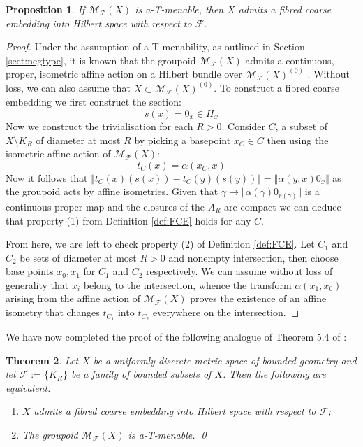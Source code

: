 \documentclass[preprint]{elsarticle}
\theoremstyle{plain}
\newtheorem{theorem}{Theorem}%
\newtheorem{proposition}[theorem]{Proposition}%
\theoremstyle{definition}%
\theoremstyle{remark}%
\begin{document}
\begin{proposition}
If $\mathcal{M}_{\mathcal{F}}(X)$ is a-T-menable, then $X$ admits a fibred coarse embedding into Hilbert space with respect to $\mathcal{F}$.
\end{proposition} 
\begin{proof}
Under the assumption of a-T-menability, as outlined in Section \ref{sect:negtype}, it is known that the groupoid $\mathcal{M}_{\mathcal{F}}(X)$ admits a continuous, proper, isometric affine action on a Hilbert bundle over $\mathcal{M}_{\mathcal{F}}(X)^{(0)}$ \cite{MR1703305,Renault2012}. Without loss, we can also assume that $X \subset \mathcal{M}_{\mathcal{F}}(X)^{(0)}$. To construct a fibred coarse embedding we first construct the section:
\begin{equation*}
s(x) = 0_{x} \in H_{x}
\end{equation*}
Now we construct the trivialisation for each $R>0$. Consider $C$, a subset of $X\setminus K_{R}$ of diameter at most $R$ by picking a basepoint $x_{C} \in C$ then using the isometric affine action of $\mathcal{M}_{\mathcal{F}}(X)$:
\begin{equation*}
t_{C}(x)=\alpha(x_{C},x)
\end{equation*}
Now it follows that $\Vert t_{C}(x)(s(x)) - t_{C}(y)(s(y)) \Vert = \Vert \alpha(y,x)0_{x} \Vert$ as the groupoid acts by affine isometries. Given that $\gamma \rightarrow \Vert \alpha(\gamma)0_{r(\gamma)} \Vert$ is a continuous proper map and the closures of the $A_{R}$ are compact we can deduce that property (1) from Definition \ref{def:FCE} holds for any $C$. 

From here, we are left to check property (2) of Definition \ref{def:FCE}. Let $C_{1}$ and $C_{2}$ be sets of diameter at most $R>0$ and nonempty intersection, then choose base points $x_{0}, x_{1}$ for $C_{1}$ and $C_{2}$ respectively. We can assume without loss of generality that $x_{i}$ belong to the intersection, whence the transform $\alpha(x_{1},x_{0})$ arising from the affine action of $\mathcal{M}_{\mathcal{F}}(X)$ proves the existence of an affine isometry that changes $t_{C_{1}}$ into $t_{C_{2}}$ everywhere on the intersection. 
\end{proof}

We have now completed the proof of the following analogue of Theorem 5.4 of \cite{MR1905840}:

\begin{theorem}
Let $X$ be a uniformly discrete metric space of bounded geometry and let $\mathcal{F}:=\lbrace K_{R} \rbrace$ be a family of bounded subsets of $X$. Then the following are equivalent:
\begin{enumerate}
\item $X$ admits a fibred coarse embedding into Hilbert space with respect to $\mathcal{F}$;
\item The groupoid $\mathcal{M}_{\mathcal{F}}(X)$ is a-T-menable. \qed
\end{enumerate}
\end{theorem}
\end{document}
